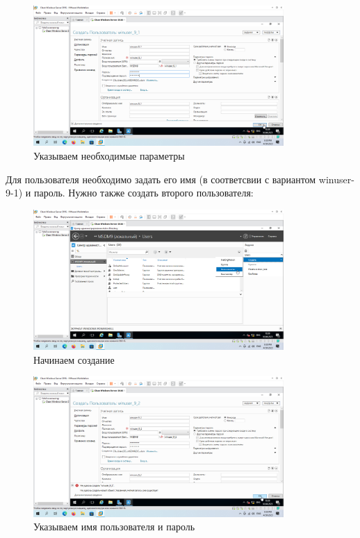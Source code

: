 \documentclass[a4paper]{article}
\begin{document}
  \begin{figure}[H]
    \centering
    \includegraphics[width=0.85\textwidth]{Screenshot_72}
    \caption{Указываем необходимые параметры}
    \label{img:72}
  \end{figure}

  Для пользователя необходимо задать его имя (в соответсвии с вариантом winuser-9-1) и пароль.
  Нужно также создать второго пользователя:

  \begin{figure}[H]
    \centering
    \includegraphics[width=0.85\textwidth]{Screenshot_73}
    \caption{Начинаем создание}
    \label{img:73}
  \end{figure}

  \begin{figure}[H]
    \centering
    \includegraphics[width=0.85\textwidth]{Screenshot_75}
    \caption{Указываем имя пользователя и пароль}
    \label{img:75}
  \end{figure}
\end{document}
